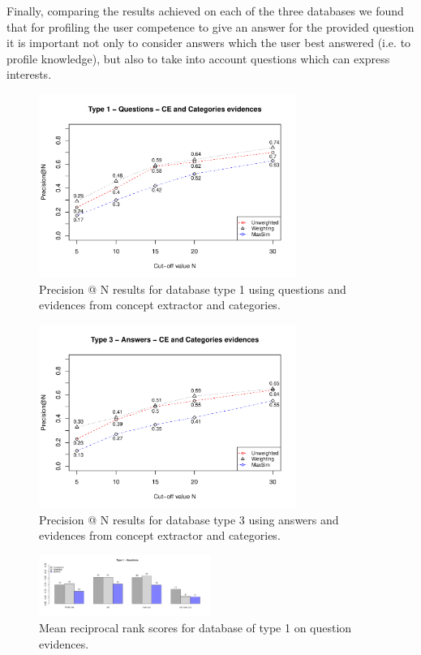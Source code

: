 \documentclass[conference]{IEEEtran}
\begin{document}
Finally, comparing the results achieved on each of the three databases we found that for profiling the user competence to give an answer for the provided question it is important not only to consider answers which the user best answered (i.e. to profile knowledge), but also to take into account  questions which can express interests.	
\begin{figure}[!t]
	\setlength{\belowcaptionskip}{-15pt}
	\setlength{\abovecaptionskip}{-5pt}
	\centering
	\includegraphics[width=3.3in]{type1questions_PAtN.pdf}
	\caption{Precision @ N results for database type 1 using questions and evidences from concept extractor and categories.}
	\label{fig:pntype1}
\end{figure}
\begin{figure}[!t]
	\setlength{\belowcaptionskip}{-15pt}
	\setlength{\abovecaptionskip}{-5pt}
	\centering
	\includegraphics[width=3.3in]{type3answers_PAtN.pdf}
	\caption{Precision @ N results for database type 3 using answers and evidences from concept extractor and categories.}
	\label{fig:pntype3}
\end{figure}
\begin{figure}[!t]
	\setlength{\belowcaptionskip}{-15pt}
	\setlength{\abovecaptionskip}{-10pt}
	\centering
	\includegraphics[width=0.5\textwidth]{mrrType1Questions.pdf}
	\caption{Mean reciprocal rank scores for database of type 1 on question evidences.}
	\label{fig:mrrtype1}
\end{figure}
\end{document}
